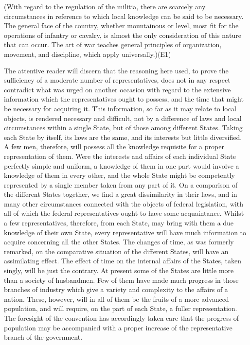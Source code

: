 (With regard to the regulation of the militia, there are scarcely any circumstances in reference to which local knowledge can be said to be necessary. The general face of the country, whether mountainous or level, most fit for the operations of infantry or cavalry, is almost the only consideration of this nature that can occur. The art of war teaches general principles of organization, movement, and discipline, which apply universally.)(E1)

The attentive reader will discern that the reasoning here used, to prove the sufficiency of a moderate number of representatives, does not in any respect contradict what was urged on another occasion with regard to the extensive information which the representatives ought to possess, and the time that might be necessary for acquiring it. This information, so far as it may relate to local objects, is rendered necessary and difficult, not by a difference of laws and local circumstances within a single State, but of those among different States. Taking each State by itself, its laws are the same, and its interests but little diversified. A few men, therefore, will possess all the knowledge requisite for a proper representation of them. Were the interests and affairs of each individual State perfectly simple and uniform, a knowledge of them in one part would involve a knowledge of them in every other, and the whole State might be competently represented by a single member taken from any part of it. On a comparison of the different States together, we find a great dissimilarity in their laws, and in many other circumstances connected with the objects of federal legislation, with all of which the federal representatives ought to have some acquaintance. Whilst a few representatives, therefore, from each State, may bring with them a due knowledge of their own State, every representative will have much information to acquire concerning all the other States. The changes of time, as was formerly remarked, on the comparative situation of the different States, will have an assimilating effect. The effect of time on the internal affairs of the States, taken singly, will be just the contrary. At present some of the States are little more than a society of husbandmen. Few of them have made much progress in those branches of industry which give a variety and complexity to the affairs of a nation. These, however, will in all of them be the fruits of a more advanced population, and will require, on the part of each State, a fuller representation. The foresight of the convention has accordingly taken care that the progress of population may be accompanied with a proper increase of the representative branch of the government.

